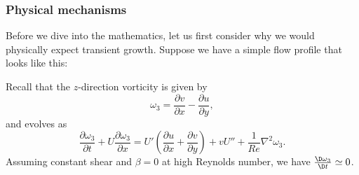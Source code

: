 \documentclass[a4paper]{article}
\begin{document}
\subsubsection*{Physical mechanisms}
Before we dive into the mathematics, let us first consider why we would physically expect transient growth. Suppose we have a simple flow profile that looks like this:
\begin{center}
\end{center}
Recall that the $z$-direction vorticity is given by
\[
  \omega_3 = \frac{\partial v}{\partial x} - \frac{\partial u}{\partial y},
\]
and evolves as
\[
  \frac{\partial \omega_3}{\partial t} + U \frac{\partial \omega_3}{\partial x} = U' \left(\frac{\partial u}{\partial x} + \frac{\partial v}{\partial y}\right) + v U'' + \frac{1}{Re} \nabla^2 \omega_3.
\]
Assuming constant shear and $\beta = 0$ at high Reynolds number, we have $\frac{\D \omega_3}{\D t} \simeq 0$.
\end{document}
